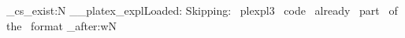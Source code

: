 \if_cs_exist:N \__platex_explLoaded:
  \GenericInfo{}
    {Skipping:~ plexpl3~ code~ already~ part~ of~ the~ format}%
  \exp_after:wN \endinput
\fi:
\cs_new:Npn \__platex_explLoaded: {  }
\cs_new_eq:NN \if_box_tate:N \tex_iftbox:D
\cs_new_eq:NN \if_box_yoko:N \tex_ifybox:D
\cs_new_eq:NN \if_box_dtou:N \tex_ifdbox:D
\cs_new_eq:NN \if_box_math:N \tex_ifmbox:D
\cs_new_eq:NN \if_direction_tate: \tex_iftdir:D
\cs_new_eq:NN \if_direction_yoko: \tex_ifydir:D
\cs_new_eq:NN \if_direction_dtou: \tex_ifddir:D
\cs_new_eq:NN \if_direction_math: \tex_ifmdir:D
\endinput
